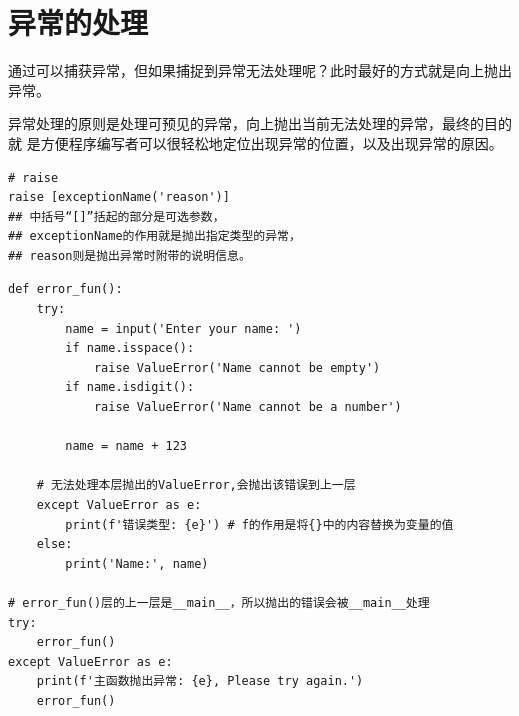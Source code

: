\section{异常的处理}
通过可以捕获异常，但如果捕捉到异常无法处理呢？此时最好的方式就是向上抛出异常。

异常处理的原则是处理可预见的异常，向上抛出当前无法处理的异常，最终的目的就
是方便程序编写者可以很轻松地定位出现异常的位置，以及出现异常的原因。

\begin{lstlisting}[style=demostyle,numbers=none]
# raise
raise [exceptionName('reason')]
## 中括号“[]”括起的部分是可选参数，
## exceptionName的作用就是抛出指定类型的异常，
## reason则是抛出异常时附带的说明信息。
\end{lstlisting}

\begin{lstlisting}[style=pythonstyle,numbers=none]
def error_fun():
    try:
        name = input('Enter your name: ')
        if name.isspace():
            raise ValueError('Name cannot be empty')
        if name.isdigit():
            raise ValueError('Name cannot be a number')
        
        name = name + 123

    # 无法处理本层抛出的ValueError,会抛出该错误到上一层
    except ValueError as e:
        print(f'错误类型: {e}') # f的作用是将{}中的内容替换为变量的值
    else:
        print('Name:', name)

# error_fun()层的上一层是__main__，所以抛出的错误会被__main__处理
try:
    error_fun()
except ValueError as e:
    print(f'主函数抛出异常: {e}, Please try again.')
    error_fun()
\end{lstlisting}



